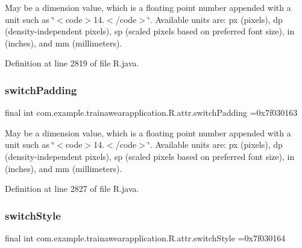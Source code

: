 May be a dimension value, which is a floating point number appended with a unit such as \char`\"{}$<$code$>$14.\+5sp$<$/code$>$\char`\"{}. Available units are\+: px (pixels), dp (density-\/independent pixels), sp (scaled pixels based on preferred font size), in (inches), and mm (millimeters). 

Definition at line 2819 of file R.\+java.

\mbox{\label{classcom_1_1example_1_1trainawearapplication_1_1_r_1_1attr_a33bedc5cd18ee85091753d00925cb870}} 
\subsubsection{\texorpdfstring{switchPadding}{switchPadding}}
{\footnotesize\ttfamily final int com.\+example.\+trainawearapplication.\+R.\+attr.\+switch\+Padding =0x7f030163\hspace{0.3cm}{\ttfamily [static]}}

May be a dimension value, which is a floating point number appended with a unit such as \char`\"{}$<$code$>$14.\+5sp$<$/code$>$\char`\"{}. Available units are\+: px (pixels), dp (density-\/independent pixels), sp (scaled pixels based on preferred font size), in (inches), and mm (millimeters). 

Definition at line 2827 of file R.\+java.

\mbox{\label{classcom_1_1example_1_1trainawearapplication_1_1_r_1_1attr_abeb5a29b86af04b32da7fe821d2b4c8b}} 
\subsubsection{\texorpdfstring{switchStyle}{switchStyle}}
{\footnotesize\ttfamily final int com.\+example.\+trainawearapplication.\+R.\+attr.\+switch\+Style =0x7f030164\hspace{0.3cm}{\ttfamily [static]}}


